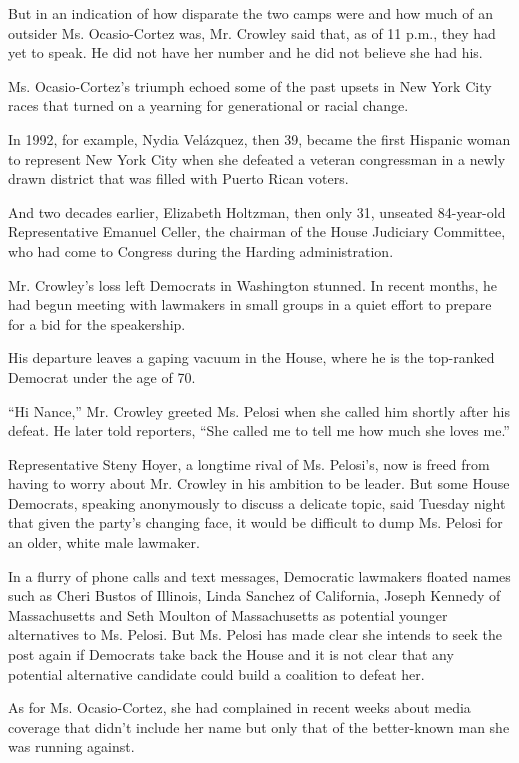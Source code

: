 But in an indication of how disparate the two camps were and how much of
an outsider Ms. Ocasio-Cortez was, Mr. Crowley said that, as of 11 p.m.,
they had yet to speak. He did not have her number and he did not believe
she had his.

Ms. Ocasio-Cortez's triumph echoed some of the past upsets in New York
City races that turned on a yearning for generational or racial change.

In 1992, for example, Nydia Velázquez, then 39, became the first
Hispanic woman to represent New York City when she defeated a veteran
congressman in a newly drawn district that was filled with Puerto Rican
voters.

And two decades earlier, Elizabeth Holtzman, then only 31, unseated
84-year-old Representative Emanuel Celler, the chairman of the House
Judiciary Committee, who had come to Congress during the Harding
administration.

Mr. Crowley's loss left Democrats in Washington stunned. In recent
months, he had begun meeting with lawmakers in small groups in a quiet
effort to prepare for a bid for the speakership.

His departure leaves a gaping vacuum in the House, where he is the
top-ranked Democrat under the age of 70.

``Hi Nance,'' Mr. Crowley greeted Ms. Pelosi when she called him shortly
after his defeat. He later told reporters, ``She called me to tell me
how much she loves me.''

Representative Steny Hoyer, a longtime rival of Ms. Pelosi's, now is
freed from having to worry about Mr. Crowley in his ambition to be
leader. But some House Democrats, speaking anonymously to discuss a
delicate topic, said Tuesday night that given the party's changing face,
it would be difficult to dump Ms. Pelosi for an older, white male
lawmaker.

In a flurry of phone calls and text messages, Democratic lawmakers
floated names such as Cheri Bustos of Illinois, Linda Sanchez of
California, Joseph Kennedy of Massachusetts and Seth Moulton of
Massachusetts as potential younger alternatives to Ms. Pelosi. But Ms.
Pelosi has made clear she intends to seek the post again if Democrats
take back the House and it is not clear that any potential alternative
candidate could build a coalition to defeat her.

As for Ms. Ocasio-Cortez, she had complained in recent weeks about media
coverage that didn't include her name but only that of the better-known
man she was running against.


